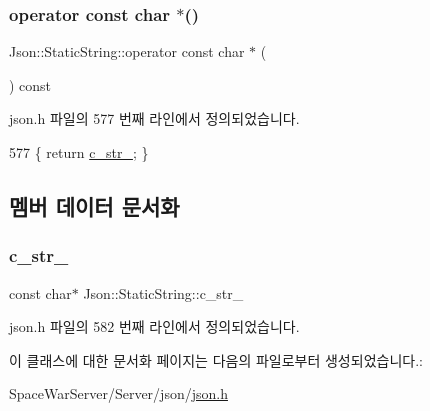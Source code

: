 \subsubsection{\texorpdfstring{operator const char $\ast$()}{operator const char *()}}
{\footnotesize\ttfamily Json\+::\+Static\+String\+::operator const char $\ast$ (\begin{DoxyParamCaption}{ }\end{DoxyParamCaption}) const\hspace{0.3cm}{\ttfamily [inline]}}



json.\+h 파일의 577 번째 라인에서 정의되었습니다.


\begin{DoxyCode}
577 \{ \textcolor{keywordflow}{return} \hyperlink{class_json_1_1_static_string_a9f0d9e8caee8f8db14e2c8c24760dffd}{c\_str\_}; \}
\end{DoxyCode}


\subsection{멤버 데이터 문서화}
\mbox{\label{class_json_1_1_static_string_a9f0d9e8caee8f8db14e2c8c24760dffd}} 
\subsubsection{\texorpdfstring{c\+\_\+str\+\_\+}{c\_str\_}}
{\footnotesize\ttfamily const char$\ast$ Json\+::\+Static\+String\+::c\+\_\+str\+\_\+\hspace{0.3cm}{\ttfamily [private]}}



json.\+h 파일의 582 번째 라인에서 정의되었습니다.



이 클래스에 대한 문서화 페이지는 다음의 파일로부터 생성되었습니다.\+:\begin{DoxyCompactItemize}
\item 
Space\+War\+Server/\+Server/json/\hyperlink{json_8h}{json.\+h}\end{DoxyCompactItemize}
